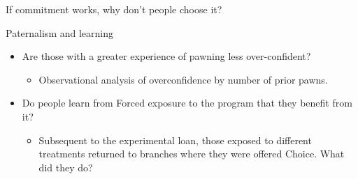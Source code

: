 \documentclass[8pt]{beamer}
\begin{document}
\begin{frame}{If commitment works, why don't people choose it?}

\hyperlink{explanations}{}


\end{frame}




\begin{frame}{Paternalism and learning}
    

    \begin{itemize}
    \item   Are those with a greater experience of pawning less over-confident?  
    \begin{itemize}
        \item Observational analysis of overconfidence by number of prior pawns.
    \end{itemize}  
    \item   Do people learn from Forced exposure to the program that they benefit from it?  
    \begin{itemize}
        \item Subsequent to the experimental loan, those exposed to different treatments returned to branches where they were offered Choice.  What did they do?
    \end{itemize}  

    \end{itemize}     

    
\end{frame}
\end{document}
